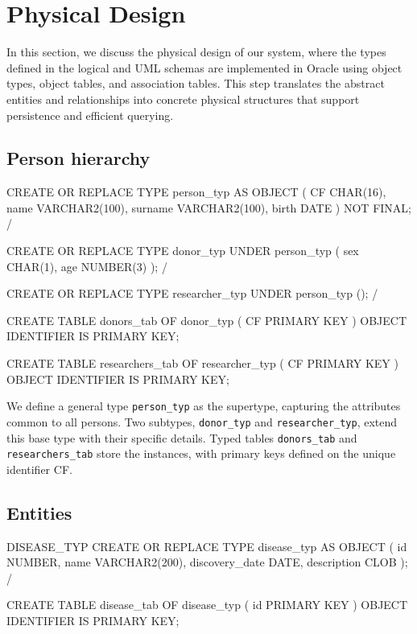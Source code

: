 \documentclass[11pt,a4paper]{article}
\begin{document}
\section{Physical Design}

In this section, we discuss the physical design of our system, where the types defined in the logical and UML schemas are implemented in Oracle using object types, object tables, and association tables. This step translates the abstract entities and relationships into concrete physical structures that support persistence and efficient querying.

\subsection{Person hierarchy}
\begin{sqlbox}[title={PERSON\_TYP, DONOR\_TYP, RESEARCHER\_TYP}]
CREATE OR REPLACE TYPE person_typ AS OBJECT (
  CF        CHAR(16),
  name      VARCHAR2(100),
  surname   VARCHAR2(100),
  birth     DATE
) NOT FINAL;
/

CREATE OR REPLACE TYPE donor_typ UNDER person_typ (
  sex CHAR(1),
  age NUMBER(3)
);
/

CREATE OR REPLACE TYPE researcher_typ UNDER person_typ ();
/

CREATE TABLE donors_tab OF donor_typ (
  CF PRIMARY KEY
) OBJECT IDENTIFIER IS PRIMARY KEY;

CREATE TABLE researchers_tab OF researcher_typ (
  CF PRIMARY KEY
) OBJECT IDENTIFIER IS PRIMARY KEY;
\end{sqlbox}

We define a general type \texttt{person\_typ} as the supertype, capturing the attributes common to all persons. Two subtypes, \texttt{donor\_typ} and \texttt{researcher\_typ}, extend this base type with their specific details. Typed tables \texttt{donors\_tab} and \texttt{researchers\_tab} store the instances, with primary keys defined on the unique identifier CF.

\subsection{Entities}
\begin{sqlbox}{DISEASE\_TYP}
CREATE OR REPLACE TYPE disease_typ AS OBJECT (
  id              NUMBER,
  name            VARCHAR2(200),
  discovery_date  DATE,
  description     CLOB
);
/

CREATE TABLE disease_tab OF disease_typ (
  id PRIMARY KEY
) OBJECT IDENTIFIER IS PRIMARY KEY;
\end{sqlbox}
\end{document}
